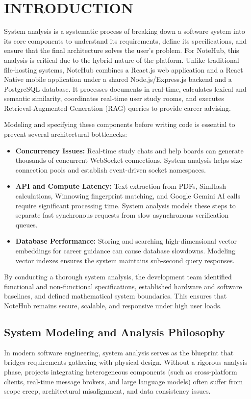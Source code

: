 \documentclass[12,Times new Roman,a4paper]{report}
\begin{document}
\section{INTRODUCTION}
System analysis is a systematic process of breaking down a software system into its core components to understand its requirements, define its specifications, and ensure that the final architecture solves the user's problem. For NoteHub, this analysis is critical due to the hybrid nature of the platform. Unlike traditional file-hosting systems, NoteHub combines a React.js web application and a React Native mobile application under a shared Node.js/Express.js backend and a PostgreSQL database. It processes documents in real-time, calculates lexical and semantic similarity, coordinates real-time user study rooms, and executes Retrieval-Augmented Generation (RAG) queries to provide career advising. 

Modeling and specifying these components before writing code is essential to prevent several architectural bottlenecks:
\begin{itemize}
    \item \textbf{Concurrency Issues:} Real-time study chats and help boards can generate thousands of concurrent WebSocket connections. System analysis helps size connection pools and establish event-driven socket namespaces.
    \item \textbf{API and Compute Latency:} Text extraction from PDFs, SimHash calculations, Winnowing fingerprint matching, and Google Gemini AI calls require significant processing time. System analysis models these steps to separate fast synchronous requests from slow asynchronous verification queues.
    \item \textbf{Database Performance:} Storing and searching high-dimensional vector embeddings for career guidance can cause database slowdowns. Modeling vector indexes ensures the system maintains sub-second query responses.
\end{itemize}

By conducting a thorough system analysis, the development team identified functional and non-functional specifications, established hardware and software baselines, and defined mathematical system boundaries. This ensures that NoteHub remains secure, scalable, and responsive under high user loads.

\subsection{System Modeling and Analysis Philosophy}
In modern software engineering, system analysis serves as the blueprint that bridges requirements gathering with physical design. Without a rigorous analysis phase, projects integrating heterogeneous components (such as cross-platform clients, real-time message brokers, and large language models) often suffer from scope creep, architectural misalignment, and data consistency issues. 
\end{document}
